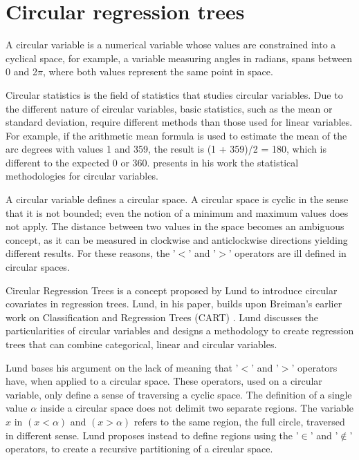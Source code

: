 \documentclass[times,twocolumn,final,authoryear]{elsarticle}
\begin{document}
\section{Circular regression trees}

A circular variable is a numerical variable whose values are constrained into a cyclical space, for example, a variable measuring angles in radians, spans between 0 and 2$ \pi $, where both values represent the same point in space. 

Circular statistics is the field of statistics that studies circular variables. Due to the different nature of circular variables, basic statistics, such as the mean or standard deviation, require different methods than those used for linear variables. For example, if the arithmetic mean formula is used to estimate the mean of the arc degrees with values 1 and 359, the result is (1 + 359)/2 = 180, which is different to the expected 0 or 360. \citep{Fisher1992} presents in his work the statistical methodologies for circular variables.

A circular variable defines a circular space. A circular space is cyclic in the sense that it is not bounded; even the notion of a minimum and maximum values does not apply. The distance between two values in the space becomes an ambiguous concept, as it can be measured in clockwise and anticlockwise directions yielding different results. For these reasons, the '$<$' and '$>$' operators are ill defined in circular spaces.

Circular Regression Trees is a concept proposed by Lund \citep{Lund2002} to introduce circular covariates in regression trees. Lund, in his paper, builds upon Breiman's earlier work on Classification and Regression Trees (CART) \citep{Breimanetal1984}. Lund discusses the particularities of circular variables and designs a methodology to create regression trees that can combine categorical, linear and circular variables.

Lund bases his argument on the lack of meaning that '$<$' and '$>$' operators have, when applied to a circular space. These operators, used on a circular variable, only define a sense of traversing a cyclic space. The definition of a single value $\alpha$ inside a circular space does not delimit two separate regions. The variable $x$ in $(x < \alpha)$ and $(x > \alpha)$ refers to the same region, the full circle, traversed in different sense. Lund proposes instead to define regions using the '$\in$' and '$\notin$' operators, to create a recursive partitioning of a circular space. 
\end{document}
